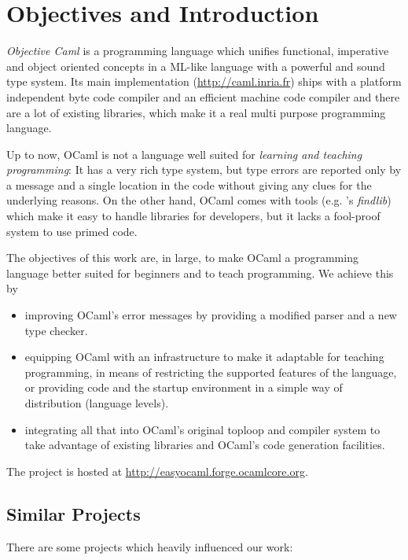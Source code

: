 
\section{Objectives and Introduction}
\label{sec:intro}

\label{hd001}
\emph{Objective Caml} \citep{leroy2008} is a programming language which unifies 
functional, imperative and object oriented concepts in a ML-like 
language with a powerful and sound type system.  Its main implementation 
(\href{http://caml.inria.fr}{http://caml.inria.fr}) ships 
with a platform independent byte code compiler and an efficient machine 
code compiler and there are a lot of existing libraries, which make it a 
real multi purpose programming language.

Up to now, OCaml is not a language well suited for \emph{learning and teaching
programming}: It has a very rich type system, but type errors are reported only
by a message and a single location in the code without giving any clues for the
underlying reasons. On the other hand, OCaml comes with tools (e.g.
\citeauthor{stolpmann}'s \emph{findlib}) which make it easy to handle libraries
for developers, but it lacks a fool-proof system to use primed code.

The objectives of this work are, in large, to make OCaml a
programming language better suited for beginners and to teach programming. We
achieve this by

\begin{itemize}
    \item improving OCaml's error messages by providing a modified 
        parser and a new type checker.
    \item equipping OCaml with an infrastructure to make it 
        adaptable for teaching programming, in means of restricting the 
        supported features of the language, or providing code and the 
        startup environment in a simple way of distribution (language 
        levels).
    \item integrating all that into OCaml's original toploop and 
        compiler system to take advantage of existing libraries and 
        OCaml's code generation facilities.
\end{itemize}
The project is hosted at
\href{http://easyocaml.forge.ocamlcore.org}{http://easyocaml.forge.ocamlcore.org}.

\subsection{Similar Projects}
\label{hd001002}
There are some projects which heavily influenced our work:

